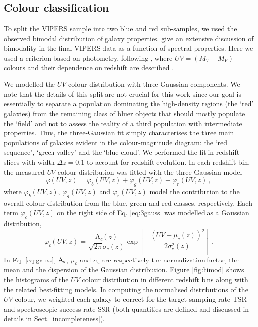 \documentclass[longauth]{aa}
\def\({\left(}
\def\){\right)}
\def\[{\left[}
\def\]{\right]}
\begin{document}
\subsection{Colour classification}\label{sec:class_col}

To split the VIPERS sample into two blue and red sub-samples, we used the observed bimodal distribution of galaxy properties. \citet{haines16} give an extensive discussion of bimodality in the final VIPERS data as a function of spectral properties.  Here we used a criterion based on photometry, following \citet{fritz14}, where $UV=(M_U-M_V)$ colours and their dependence on redshift are described  \citep[see also][]{siudek17}. 

We modelled the $UV$ colour distribution with three Gaussian components. We note that the details of this split are not crucial for this work since our goal is essentially to separate a population dominating the high-density regions (the `red' galaxies) from the remaining class of bluer objects that should mostly populate the `field' and not to assess the reality of a third population with intermediate properties. Thus, the three-Gaussian fit simply characterises the three main populations of galaxies evident in the colour-magnitude diagram: the `red sequence', `green valley' and the `blue cloud'.  We performed the fit in redshift slices with width $\Delta z=0.1$ to account for redshift evolution. In each redshift bin, the measured $UV$ colour distribution was fitted with the three-Gaussian model 
	\begin{equation}
		\varphi\(UV,z\) = \varphi_b\(UV,z\)+\varphi_g\(UV,z\)+\varphi_r\(UV,z\)\; ,					\label{eq:3gauss}
	\end{equation}
where $\varphi_b\({UV},z\)$, $\varphi_g\({UV},z\)$ and $\varphi_r\({UV},z\)$ model the contribution to the overall colour distribution from the blue, green and red classes, respectively. Each term $\varphi_c\({UV},z\)$ on the right side of Eq. \eqref{eq:3gauss} was modelled as a Gaussian distribution,
	\begin{equation}
		\varphi_c\({UV},z\) = \frac{\mathrm{A}_c\(z\)}{\sqrt{2\pi}\sigma_c\(z\)}\exp{\[-\frac{\({UV}-\mu_c\(z\)\)^2}{2\sigma_c^2\(z\)}\]}\; .									\label{eq:gauss}
	\end{equation}
In Eq. \eqref{eq:gauss}, $\rm{A}_c$, $\mu_c$ and $\sigma_c$ are respectively the normalization factor, the mean and the dispersion of the Gaussian distribution. Figure \ref{fig:bimod} shows the histograms of the $UV$ colour distribution in different redshift bins along with the related best-fitting models. In computing the normalised distributions of the $UV$ colour, we weighted each galaxy to correct for the target sampling rate TSR and spectroscopic success rate SSR (both quantities are defined and discussed in details in Sect. \ref{incompleteness}).
\end{document}
